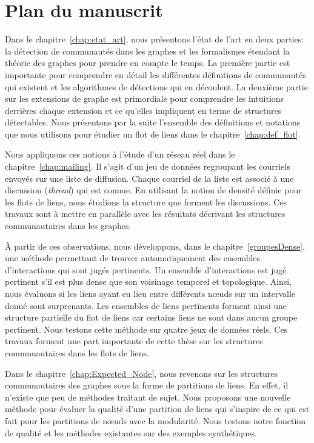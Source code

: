 \section*{Plan du manuscrit}


Dans le chapitre~\ref{chap:etat_art}, nous présentons l'état de l'art en deux parties: la détection de communautés dans les graphes et les formalismes étendant la théorie des graphes pour prendre en compte le temps.
La première partie est importante pour comprendre en détail les différentes définitions de communautés qui existent et les algorithmes de détections qui en découlent.
La deuxième partie sur les extensions de graphe est primordiale pour comprendre les intuitions derrières chaque extension et ce qu'elles impliquent en terme de structures détectables.
Nous présentons par la suite l'ensemble des définitions et notations que nous utilisons pour étudier un flot de liens dans le chapitre~\ref{chap:def_flot}.

Nous appliquons ces notions à l'étude d'un réseau réel dans le chapitre~\ref{chap:mailing}.
Il s'agit d'un jeu de données regroupant les courriels envoyés sur une liste de diffusion.
Chaque courriel de la liste est associé à une discussion (\emph{thread}) qui est connue.
En utilisant la notion de densité définie pour les flots de liens, nous étudions la structure que forment les discussions.
Ces travaux sont à mettre en parallèle avec les résultats décrivant les structures communautaires dans les graphes.


\`A partir de ces observations, nous développons, dans le chapitre~\ref{groupesDense}, une méthode permettant de trouver automatiquement des ensembles d'interactions qui sont jugés pertinents.
Un ensemble d'interactions est jugé pertinent s’il est plus dense que son voisinage temporel et topologique.
Ainsi, nous évaluons si les liens ayant eu lieu entre différents n\oe uds sur un intervalle donné sont surprenants.
Les  ensembles de liens pertinents forment ainsi une structure partielle du flot de liens car certains liens ne sont dans aucun groupe pertinent.
Nous testons cette méthode sur quatre jeux de données réels.
Ces travaux forment une part importante de cette thèse sur les structures communautaires dans les flots de liens.

Dans le chapitre~\ref{chap:Expected_Node}, nous revenons sur les structures communautaires des graphes sous la forme de partitions de liens.
En effet, il n'existe que peu de méthodes traitant de sujet.
Nous proposons une nouvelle méthode pour évaluer la qualité d'une partition de liens qui s'inspire de ce qui est fait pour les partitions de n\oe uds avec la modularité.
Nous testons notre fonction de qualité et les méthodes existantes sur des exemples synthétiques.

